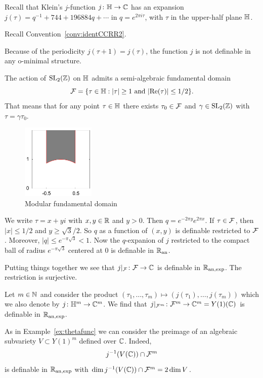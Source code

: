 \begin{example}
  \label{ex:jfunction}
  Recall that Klein's $j$-function $j\colon {\mathbb{H}}\rightarrow{\mathbb{C}}$ has an
  expansion $j(\tau)=q^{-1}+744+196884q+\cdots$
  in $q = e^{2\pi i \tau}$, with $\tau$ in the upper-half plane ${\mathbb{H}}$.

  Recall Convention~\ref{conv:identCCRR2}.
  
  Because of the periodicity $j(\tau+1)=j(\tau)$, the function
  $j$ is not definable in any o-minimal structure.

  The action of $\mathrm{SL}_2({\mathbb{Z}})$ on ${\mathbb{H}}$ admits a semi-algebraic
  fundamental domain %
  \begin{equation*}
    {\mathcal F} = \{ \tau\in {\mathbb{H}}: |\tau|\ge 1 \text{ and
    }|\mathrm{Re}(\tau)|\le 1/2\}.
  \end{equation*}
  That means that 
  for any point $\tau\in{\mathbb{H}}$ there exists $\tau_0\in {\mathcal F}$ and
  $\gamma\in \mathrm{SL}_2({\mathbb{Z}})$ with $\tau=\gamma\tau_0$.
  
  \begin{figure}
    \label{fig:modfd}
    \centering
    \includegraphics[width=3.5cm]{fd.png}
    \caption{Modular fundamental domain}
  \end{figure}

  We write $\tau = x+yi$ with $x,y\in{\mathbb{R}}$ and $y>0$.
  Then $q=e^{-2\pi y} e^{2\pi x}$.
  If $\tau\in {\mathcal F}$, then $|x|\le 1/2$ and $y\ge \sqrt{3}/2$.
  So $q$ as a function of $(x,y)$ is definable restricted to
  ${\mathcal F}$. Moreover, $|q|\le e^{-\pi\sqrt{3}}< 1$. Now
  the $q$-expanion of $j$ restricted to the compact ball of radius
  $e^{-\pi\sqrt{3}}$ centered at $0$ is definable in ${{\mathbb{R}}_{\mathrm{an}}}$.

  Putting things together we see that $j|_{{\mathcal F}}\colon
  {\mathcal F}\rightarrow{\mathbb{C}}$ is definable in ${{\mathbb{R}}_{\mathrm{an,exp}}}$. The restriction is
  surjective.

  Let $m\in{\mathbb{N}}$ and consider the product $(\tau_1,\ldots,\tau_m)\mapsto
  (j(\tau_1),\ldots,j(\tau_m))$ which we also denote by
  $j\colon{\mathbb{H}}^m\rightarrow{\mathbb{C}}^m$. We find that
  $j|_{{\mathcal F}^m}\colon {\mathcal F}^m\rightarrow{\mathbb{C}}^m=Y(1)({\mathbb{C}})$ is definable in ${{\mathbb{R}}_{\mathrm{an,exp}}}$.

  As in Example~\ref{ex:thetafunc} we can consider the preimage of an
  algebraic subvariety $V\subset Y(1)^m$ defined over ${\mathbb{C}}$.
  Indeed,
  \begin{equation*}
    j^{-1}(V({\mathbb{C}})) \cap {\mathcal F}^m
  \end{equation*}
  is definable in ${{\mathbb{R}}_{\mathrm{an,exp}}}$ with $\dim j^{-1}(V({\mathbb{C}}))\cap {\mathcal F}^m =
  2\dim V$.  
\end{example}

